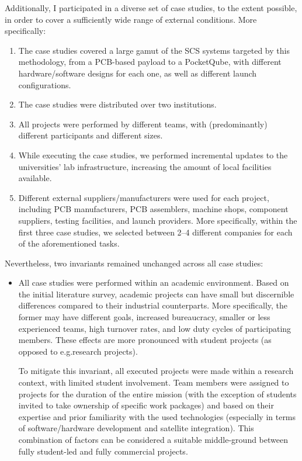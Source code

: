 \documentclass[a4paper,nobib,justified,final]{tufte-book}
\begin{document}
\begin{fullwidth}
\begin{enumerate}
	Additionally, I participated in a diverse set of case studies, to the extent possible, in order to cover a sufficiently wide range of external conditions.
	More specifically:
	\begin{enumerate}[itemsep=-2ex]
		\item The case studies covered a large gamut of the \acs{SCS} systems targeted by this methodology, from a \acs{PCB}-based payload to a PocketQube, with different hardware/software designs for each one, as well as different launch configurations.
		\item The case studies were distributed over two institutions.
		\item All projects were performed by different teams, with (predominantly) different participants and different sizes.
		\item While executing the case studies, we performed incremental updates to the universities' lab infrastructure, increasing the amount of local facilities available.
		\item Different external suppliers/manufacturers were used for each project, including \acs{PCB} manufacturers, \acs{PCB} assemblers, machine shops, component suppliers, testing facilities, and launch providers. More specifically, within the first three case studies, we selected between 2--4 different companies for each of the aforementioned tasks.
	\end{enumerate}

	Nevertheless, two invariants remained unchanged across all case studies:
	\begin{itemize}[itemsep=-2ex]
		\item All case studies were performed within an academic environment. 
		Based on the initial literature survey, academic projects can have small but discernible differences compared to their industrial counterparts.
		More specifically, the former may have different goals, increased bureaucracy,  smaller or less experienced teams, high turnover rates, and low duty cycles of participating members. These effects are more pronounced with student projects (as opposed to e.g.\@ research projects).
		
		To mitigate this invariant, all executed projects were made within a research context, with limited student involvement. Team members were assigned to projects for the duration of the entire mission (with the exception of students invited to take ownership of specific work packages) and based on their expertise and prior familiarity with the used technologies (especially in terms of software/hardware development and satellite integration). This combination of factors can be considered a suitable middle-ground between fully student-led and fully commercial projects.


\end{itemize}
\end{enumerate}
\end{fullwidth}
\end{document}
